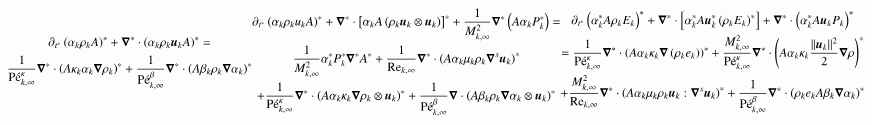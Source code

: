 \documentclass[preprint,10pt]{elsarticle}
\begin{document}
% 
\begin{subequations}\label{eq:sev_equ_case_one_scaled}
%
%
\begin{multline}\label{eq:sev_equ-with-diss-terms-cont_case_one_scaled}
\partial_{t^*} \left( \alpha_k \rho_k A \right)^* + \grad^* \cdot \left( \alpha_k \rho_k \mbold u_k A \right)^* = \\ \frac{1}{\Pe^\kappa_{k,\infty}}\grad^* \cdot \left(A \kappa_k \alpha_k \grad \rho_k \right)^* +
\frac{1}{\Pe_{k,\infty}^\beta} \grad^* \cdot \left( A \beta_k \rho_k \grad \alpha_k \right)^*
\end{multline}
%
\begin{multline}\label{eq:sev_equ-with-diss-terms-mom_case_one_scaled}
\partial_{t^*} \left( \alpha_k \rho_k u_k A \right)^* + \grad^* \cdot \left[ \alpha_k A \left( \rho_k \mbold u_k \otimes \mbold u_k\right)\right]^* + \frac{1}{M^2_{k,\infty}}\grad^* \left( A \alpha_k P_k^* \right) = \\
  \frac{1}{M^2_{k,\infty}} \alpha_k^* P^*_k \grad^* A^*  
+ \frac{1}{\Re_{k,\infty}}\grad^* \cdot \left( A \alpha_k \mu_k \rho_k \grad^s \mbold u_k \right)^* \\ 
+ \frac{1}{\Pe_{k,\infty}^\kappa} \grad^* \cdot\left( A \alpha_k \kappa_k \grad \rho_k \otimes \mbold u_k \right)^* 
+ \frac{1}{\Pe_{k,\infty}^\beta} \grad \cdot \left( A \beta_k \rho_k \grad \alpha_k \otimes \mbold u_k \right)^*
\end{multline}
%
\begin{multline}\label{eq:sev_equ-with-diss-terms-ener_case_one_scaled}
\partial_{t^*} \left( \alpha_k^* A \rho_k E_k \right)^* + \grad^* \cdot \left[ \alpha_k^* A \mbold u_k^*  \left( \rho_k E_k \right)^* \right] +  \grad^* \cdot \left(\alpha_k^* A \mbold u_k P_k \right)^*  \\ =
\frac{1}{\Pe_{k,\infty}^\kappa} \grad^* \cdot \left( A \alpha_k \kappa_k \grad \left( \rho_k e_k \right) \right)^* 
+ \frac{M^2_{k,\infty}}{\Pe_{k,\infty}^\kappa} \grad^* \cdot \left( A\alpha_k \kappa_k \frac{||\mbold u_k||^2}{2} \grad \rho \right)^*  \\
+ \frac{M^2_{k,\infty}}{\Re_{k,\infty}} \grad^* \cdot \left( A \alpha_k \mu_k \rho_k \mbold u_k : \grad^s \mbold u_k\right)^* 
+ \frac{1}{\Pe_{k,\infty}^\beta } \grad^*\cdot \left( \rho_k e_k A \beta_k \grad \alpha_k \right)^*
\end{multline}
%
\end{subequations}
\end{document}
